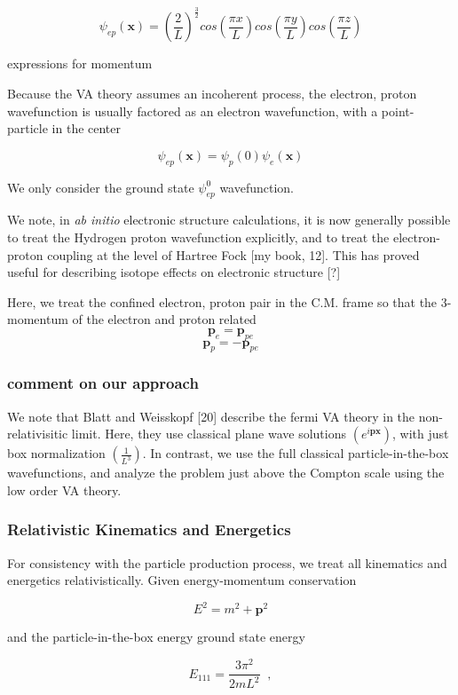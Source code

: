 \documentclass[11pt]{amsart}
\begin{document}
$$\psi_{ep}(\mathbf{x})=\left(\dfrac{2}{L}\right)^{\frac{3}{2}}cos\left(\dfrac{\pi x}{L}\right)cos\left(\dfrac{\pi y}{L}\right)cos\left(\dfrac{\pi z}{L}\right)$$

expressions for momentum

Because the VA theory assumes an incoherent process, the electron, proton wavefunction is usually factored as an electron wavefunction, with a point-particle in the center

$$\psi_{ep}(\mathbf{x})=\psi_{p}(0)\psi_{e}(\mathbf{x})$$

We only consider the  ground state $\psi_{ep}^{0}$ wavefunction.


We note, in \emph{ab initio} electronic structure calculations, it is now generally possible to treat the Hydrogen proton wavefunction explicitly, and to treat the electron-proton coupling at the level of Hartree Fock [my book, 12].  This has proved useful for describing isotope effects on electronic structure [?]

Here, we treat the confined electron, proton pair in the C.M. frame so that the 3-momentum of the electron and proton related
$$\mathbf{p}_{e}=\mathbf{p}_{pe}$$
$$\mathbf{p}_{p}=-\mathbf{p}_{pe}$$

\subsubsection{comment on our approach}

We note that Blatt and Weisskopf [20] describe the fermi VA theory in the non-relativisitic limit.  Here, they use classical plane wave solutions $(e^{i\mathbf{p}\mathbf{x}})$, with just box normalization $(\frac{1}{L^{3}})$.  In contrast, we use the full classical particle-in-the-box wavefunctions, and analyze the problem just above the Compton scale using the low order VA theory.


\subsubsection{Relativistic Kinematics and Energetics}
For consistency with the particle production process, we treat all kinematics and energetics relativistically.  Given energy-momentum conservation

$$E^{2}=m^{2}+\mathbf{p}^{2}$$

and the particle-in-the-box energy ground state energy 

$$E_{111}=\dfrac{3\pi^{2}}{2mL^{2}}\;\;,$$
\end{document}

